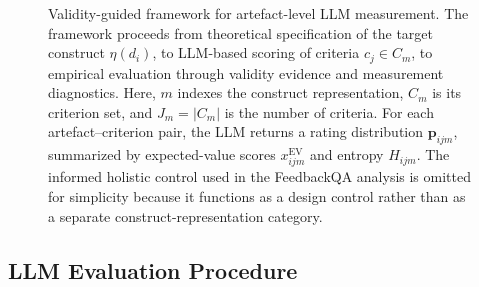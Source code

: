 \begin{figure}[h]
{\begin{tikzpicture}
\end{tikzpicture}%
}
\caption{Validity-guided framework for artefact-level LLM measurement. The framework proceeds from theoretical specification of the target construct $\eta(d_i)$, to LLM-based scoring of criteria $c_j \in C_m$, to empirical evaluation through validity evidence and measurement diagnostics. Here, $m$ indexes the construct representation, $C_m$ is its criterion set, and $J_m=|C_m|$ is the number of criteria. For each artefact--criterion pair, the LLM returns a rating distribution $\mathbf{p}_{ijm}$, summarized by expected-value scores $x^{\mathrm{EV}}_{ijm}$ and entropy $H_{ijm}$. The informed holistic control used in the FeedbackQA analysis is omitted for simplicity because it functions as a design control rather than as a separate construct-representation category.}
\label{fig:measurement_framework}
\end{figure}



\subsection{LLM Evaluation Procedure}\label{sec:methods_llm_procedure}

